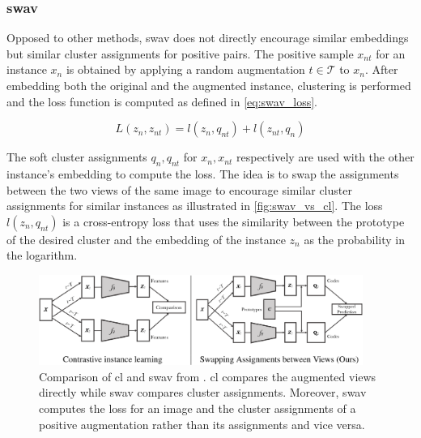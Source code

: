 \subsubsection{\acl{swav}}\label{subsubsec:SwAV}

Opposed to other methods, \ac{swav} does not directly encourage similar embeddings but similar 
cluster assignments for positive pairs.
The positive sample $x_{nt}$ for an instance $x_n$ is obtained by applying a 
random augmentation $t \in \mathcal{T}$ to $x_n$.
After embedding both the original and the augmented instance, clustering is performed and 
the loss function is computed as defined in \eqref{eq:swav_loss}.

\begin{equation}
    L(z_n, z_{nt}) = l(z_n, q_{nt}) + l(z_{nt}, q_n)
    \label{eq:swav_loss}
\end{equation}

The soft cluster assignments $q_n, q_{nt}$ for $x_n, x_{nt}$ respectively 
are used with the other instance's embedding to compute the loss.
The idea is to swap the assignments between the two views of the same image to encourage 
similar cluster assignments for similar instances as illustrated in \autoref{fig:swav_vs_cl}.
The loss $l(z_n, q_{nt})$ is a cross-entropy loss that uses the similarity between the prototype 
of the desired cluster and the embedding of the instance $z_n$ as the probability in the logarithm.

\begin{figure}[h] %
    \centering
    \includegraphics[width=300pt]{images/SwAV_vs_CL.png}
    \caption{Comparison of \ac{cl} and \ac{swav} from \citet{swav_2020}.
    \ac{cl} compares the augmented views directly while 
    \ac{swav} compares cluster assignments.
    Moreover, \ac{swav} computes the loss for an image and the cluster assignments of a positive augmentation 
    rather than its assignments and vice versa.}
    \label{fig:swav_vs_cl}
\end{figure}

